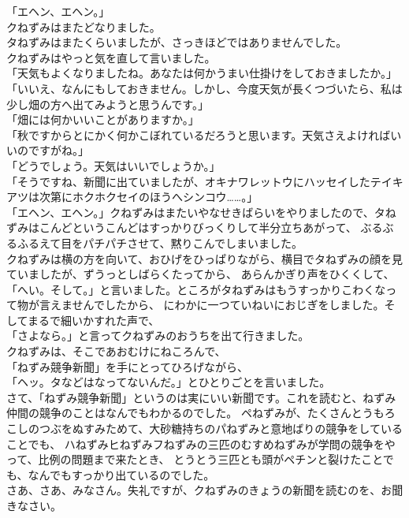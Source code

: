 \documentclass[
a4paper,
10pt,
book]
{tarticle}
\begin{document}
「エヘン、エヘン。」\\
\indent クねずみはまたどなりました。\\
\indent タねずみはまたくらいましたが、さっきほどではありませんでした。\\
\indent クねずみはやっと気を直して言いました。\\
「天気もよくなりましたね。あなたは何かうまい仕掛けをしておきましたか。」\\
「いいえ、なんにもしておきません。しかし、今度天気が長くつづいたら、私は少し畑の方へ出てみようと思うんです。」\\
「畑には何かいいことがありますか。」\\
「秋ですからとにかく何かこぼれているだろうと思います。天気さえよければいいのですがね。」\\
「どうでしょう。天気はいいでしょうか。」\\
「そうですね、新聞に出ていましたが、オキナワレットウにハッセイしたテイキアツは次第にホクホクセイのほうへシンコウ……。」\\
「エヘン、エヘン。」クねずみはまたいやなせきばらいをやりましたので、タねずみはこんどというこんどはすっかりびっくりして半分立ちあがって、
ぶるぶるふるえて目をパチパチさせて、黙りこんでしまいました。\\
\indent クねずみは横の方を向いて、おひげをひっぱりながら、横目でタねずみの顔を見ていましたが、ずうっとしばらくたってから、
あらんかぎり声をひくくして、\\
「へい。そして。」と言いました。ところがタねずみはもうすっかりこわくなって物が言えませんでしたから、
にわかに一つていねいにおじぎをしました。そしてまるで細いかすれた声で、\\
「さよなら。」と言ってクねずみのおうちを出て行きました。\\
\indent クねずみは、そこであおむけにねころんで、\\
「ねずみ競争新聞」を手にとってひろげながら、\\
「ヘッ。タなどはなってないんだ。」とひとりごとを言いました。\\
\indent さて、「ねずみ競争新聞」というのは実にいい新聞です。これを読むと、ねずみ仲間の競争のことはなんでもわかるのでした。
ペねずみが、たくさんとうもろこしのつぶをぬすみためて、大砂糖持ちのパねずみと意地ばりの競争をしていることでも、
ハねずみヒねずみフねずみの三匹のむすめねずみが学問の競争をやって、比例の問題まで来たとき、
とうとう三匹とも頭がペチンと裂けたことでも、なんでもすっかり出ているのでした。\\
\indent さあ、さあ、みなさん。失礼ですが、クねずみのきょうの新聞を読むのを、お聞きなさい。\\
\end{document}

